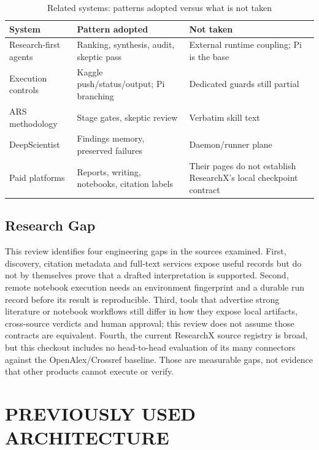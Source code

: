 \documentclass[12pt,a4paper]{report}
\numberwithin{equation}{chapter}
\begin{document}
\begin{table}[ht]
\centering
\caption{Related systems: patterns adopted versus what is not taken}
\small
\begin{tabular}{@{}L{2.5cm}L{5.0cm}L{5.5cm}@{}}
\toprule
System & Pattern adopted & Not taken \\
\midrule
Research-first agents & Ranking, synthesis, audit, skeptic pass & External runtime coupling; Pi is the base \\
Execution controls & Kaggle push/status/output; Pi branching & Dedicated guards still partial \\
ARS methodology & Stage gates, skeptic review & Verbatim skill text \\
DeepScientist & Findings memory, preserved failures & Daemon/runner plane \\
Paid platforms & Reports, writing, notebooks, citation labels & Their pages do not establish ResearchX's local checkpoint contract \\
\bottomrule
\end{tabular}
\end{table}

\section{Research Gap}
This review identifies four engineering gaps in the sources examined. First,
discovery, citation metadata and full-text services expose useful records but
do not by themselves prove that a drafted interpretation is supported. Second,
remote notebook execution needs an environment fingerprint and a durable
run record before its result is reproducible. Third, tools that advertise
strong literature or notebook workflows still differ in how they expose
local artifacts, cross-source verdicts and human approval; this review does
not assume those contracts are equivalent. Fourth, the current ResearchX
source registry is broad, but this checkout includes no head-to-head evaluation
of its many connectors against the OpenAlex/Crossref baseline. Those are
measurable gaps, not evidence that other products cannot execute or verify.

\chapter{PREVIOUSLY USED ARCHITECTURE}
\end{document}
